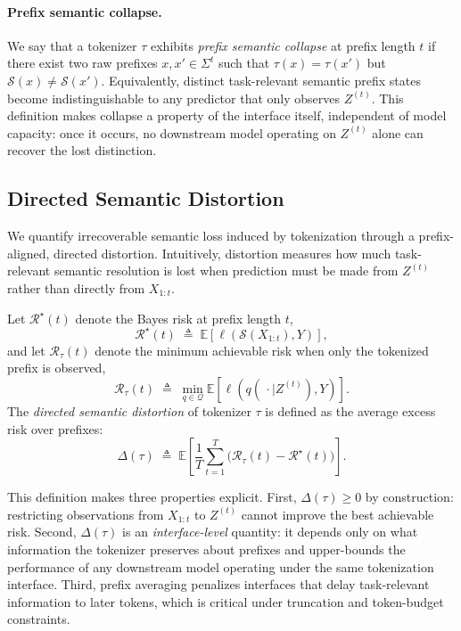 \paragraph{Prefix semantic collapse.}
We say that a tokenizer $\tau$ exhibits \emph{prefix semantic collapse} at prefix length $t$ if there exist two raw prefixes $x, x' \in \Sigma^{t}$ such that
$\tau(x)=\tau(x')$ but $\mathcal{S}(x)\neq \mathcal{S}(x')$.
Equivalently, distinct task-relevant semantic prefix states become indistinguishable to any predictor that only observes $Z^{(t)}$.
This definition makes collapse a property of the interface itself, independent of model capacity: once it occurs, no downstream model operating on $Z^{(t)}$ alone can recover the lost distinction.

\subsection{Directed Semantic Distortion}
\label{sec:distortion}

We quantify irrecoverable semantic loss induced by tokenization through a prefix-aligned, directed distortion.
Intuitively, distortion measures how much task-relevant semantic resolution is lost when prediction must be made from $Z^{(t)}$ rather than directly from $X_{1:t}$.

Let $\mathcal{R}^\star(t)$ denote the Bayes risk at prefix length $t$,
\begin{equation}
\mathcal{R}^\star(t)
\;\triangleq\;
\mathbb{E}\!\left[\ell\!\left(\mathcal{S}(X_{1:t}), Y\right)\right],
\label{eq:bayes_risk_raw}
\end{equation}
and let $\mathcal{R}_\tau(t)$ denote the minimum achievable risk when only the tokenized prefix is observed,
\begin{equation}
\mathcal{R}_\tau(t)
\;\triangleq\;
\min_{q \in \mathcal{Q}}
\mathbb{E}\!\left[\ell\!\left(q(\,\cdot \mid Z^{(t)}), Y\right)\right].
\label{eq:bayes_risk_tok}
\end{equation}
The \emph{directed semantic distortion} of tokenizer $\tau$ is defined as the average excess risk over prefixes:
\begin{equation}
\Delta(\tau)
\;\triangleq\;
\mathbb{E}\!\left[
\frac{1}{T}\sum_{t=1}^{T}
\big(\mathcal{R}_\tau(t) - \mathcal{R}^\star(t)\big)
\right].
\label{eq:semantic_distortion}
\end{equation}

This definition makes three properties explicit.
First, $\Delta(\tau)\ge 0$ by construction: restricting observations from $X_{1:t}$ to $Z^{(t)}$ cannot improve the best achievable risk.
Second, $\Delta(\tau)$ is an \emph{interface-level} quantity: it depends only on what information the tokenizer preserves about prefixes and upper-bounds the performance of any downstream model operating under the same tokenization interface.
Third, prefix averaging penalizes interfaces that delay task-relevant information to later tokens, which is critical under truncation and token-budget constraints.

